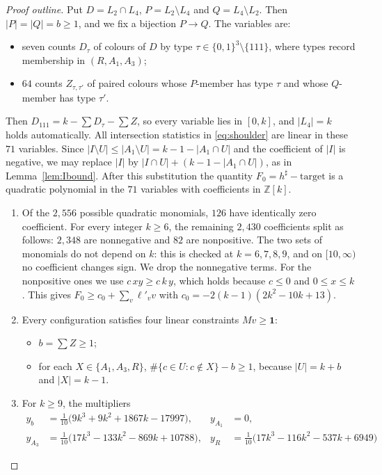 \documentclass[11pt]{amsart}
\theoremstyle{definition}
\theoremstyle{remark}
\newcommand{\1}{\mathbf 1}
\begin{document}
\begin{proof}[Proof outline]
Put $D=L_2\cap L_4$, $P=L_2\setminus L_4$ and $Q=L_4\setminus L_2$. Then $|P|=|Q|=b\ge1$, and we fix a
bijection $P\to Q$. The variables are:
\begin{itemize}
\item seven counts $D_\tau$ of colours of $D$ by type $\tau\in\{0,1\}^3\setminus\{111\}$, where types
  record membership in $(R,A_1,A_3)$;
\item $64$ counts $Z_{\tau,\tau'}$ of paired colours whose $P$-member has type $\tau$ and whose
  $Q$-member has type $\tau'$.
\end{itemize}
Then $D_{111}=k-\sum D_\tau-\sum Z$, so every variable lies in $[0,k]$, and $|L_4|=k$ holds automatically.
All intersection statistics in \eqref{eq:shoulder} are linear in these $71$ variables. Since
$|I\setminus U|\le|A_1\setminus U|=k-1-|A_1\cap U|$ and the coefficient of $|I|$ is negative, we may
replace $|I|$ by $|I\cap U|+(k-1-|A_1\cap U|)$, as in Lemma~\ref{lem:Ibound}. After this substitution the
quantity $F_0=h^\sharp-\mathrm{target}$ is a quadratic polynomial in the
$71$ variables with coefficients in $\mathbb Z[k]$.
\begin{enumerate}[label=(\arabic*)]
\item Of the $2{,}556$ possible quadratic monomials, $126$ have identically zero coefficient. For every integer $k\ge6$, the remaining $2{,}430$ coefficients split as follows: $2{,}348$ are nonnegative and $82$ are nonpositive. The two sets of monomials do not depend on $k$: this is checked at $k=6,7,8,9$, and
  on $[10,\infty)$ no coefficient changes sign. We drop the nonnegative terms. For the nonpositive ones we use $c\,xy\ge c\,k\,y$, which holds because
  $c\le0$ and $0\le x\le k$. This gives $F_0\ge c_0+\sum_v \ell'_v v$ with
  $c_0=-2(k-1)(2k^2-10k+13)$.
\item Every configuration satisfies four linear constraints $Mv\ge\1$:
  \begin{itemize}
  \item $b=\sum Z\ge1$;
  \item for each $X\in\{A_1,A_3,R\}$, $\#\{c\in U: c\notin X\}-b\ge1$, because $|U|=k+b$ and $|X|=k-1$.
  \end{itemize}
\item For $k\ge 9$, the multipliers
\[
\begin{aligned}
y_b&=\tfrac{1}{10}\bigl(9k^3+9k^2+1867k-17997\bigr), & y_{A_1}&=0,\\
y_{A_3}&=\tfrac{1}{10}\bigl(17k^3-133k^2-869k+10788\bigr), & y_R&=\tfrac{1}{10}\bigl(17k^3-116k^2-537k+6949\bigr)

\end{aligned}\]
\end{enumerate}
\end{proof}
\end{document}
